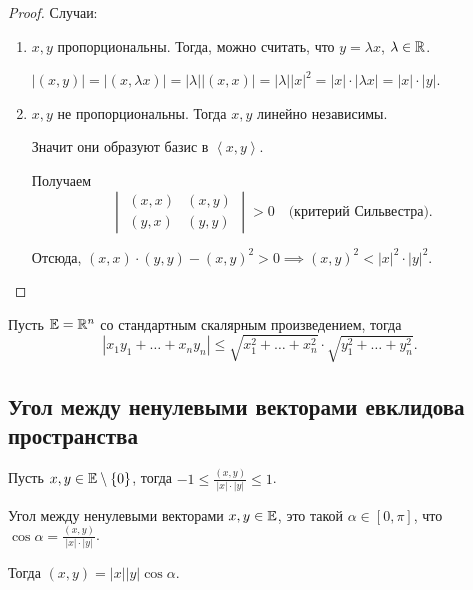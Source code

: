 \begin{proof}
    Случаи:
    \begin{enumerate}
    \item $x, y$ пропорциональны. Тогда, можно считать, что $y = \lambda x$, $\lambda \in \mathbb{R}$.

        $|(x, y)| = |(x, \lambda x)| = |\lambda| |(x, x)| = |\lambda| |x|^2 = |x| \cdot |\lambda x| = |x| \cdot |y|$.

    \item $x, y$ не пропорциональны. Тогда $x, y$ линейно независимы.

        Значит они образуют базис в $\left< x, y \right>$.

        Получаем
        \begin{equation*}
            \begin{vmatrix} 
                (x, x) & (x, y) \\
                (y, x) & (y, y)
            \end{vmatrix} > 0 \quad \text{(критерий Сильвестра)}
        .\end{equation*}

        Отсюда, $(x, x) \cdot (y, y) - (x, y)^2 > 0 \implies (x, y)^2 < |x|^2 \cdot |y|^2$.
    \end{enumerate}
\end{proof}

\begin{example}
    Пусть $\mathbb{E} = \mathbb{R}^n$ со стандартным скалярным произведением, тогда
    \begin{equation*}
        |x_1 y_1 + \dots + x_n y_n| \leq \sqrt{x_1^2 + \dots + x_n^2} \cdot \sqrt{y_1^2 + \dots + y_n^2}
    .\end{equation*}
\end{example}


\subsection{Угол между ненулевыми векторами евклидова пространства}

Пусть $x, y \in \mathbb{E} \setminus \{0\}$, тогда $-1 \leq \frac{(x, y)}{|x| \cdot |y|} \leq 1$.

\begin{definition}
    Угол между ненулевыми векторами $x, y \in \mathbb{E}$, это такой $\alpha \in [0, \pi]$, что $\cos \alpha = \frac{(x, y)}{|x| \cdot |y|}$.

    Тогда $(x, y) = |x| |y| \cos \alpha$.
\end{definition}


